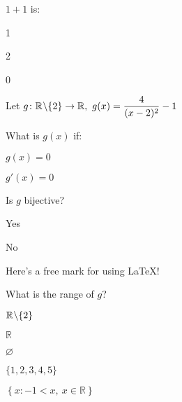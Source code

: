 \documentclass[a4paper]{article}
\begin{document}
\begin{question}{1}
    $1 + 1$ is:
    \begin{multiplechoice}
        \item 1
        \item 2
        \item 0
    \end{multiplechoice}
\end{question}


\begin{question}{7}
    Let $\displaystyle
    g\colon \mathbb{R}\hspace{0.05em}\backslash \{2\}\to \mathbb{R},~ g(x) = \frac{4}{(x-2)^{2}} - 1$
    \begin{subquestion}{\undefined}
        What is $g(x)$ if:
        \begin{subsubquestion}{1}
            $g(x) = 0$
            \shortanswer
        \end{subsubquestion}
        \begin{subsubquestion}{2}
            $\displaystyle
                g'(x) = 0
            $
        \end{subsubquestion}
    \end{subquestion}
    \begin{subquestion}{1}
        Is $g$ bijective?
        \begin{multiplechoice}
        \item Yes
        \item No
        \end{multiplechoice}
    \end{subquestion}
    \begin{subquestion}{1}
        Here's a free mark for using \LaTeX !
    \end{subquestion}
    \begin{subquestion}{2}
        What is the range of $g$?
        \begin{multiplechoice}
            \item $\mathbb{R}\hspace{0.05em}\backslash \{2\}$
            \item $\mathbb{R}$
            \item $\varnothing$
            \item $\{1, 2, 3, 4, 5\}$
            \item $\left\{x\colon -1 < x,~ x \in \mathbb{R}\right\}$
        \end{multiplechoice}
    \end{subquestion}
\end{question}
\end{document}
